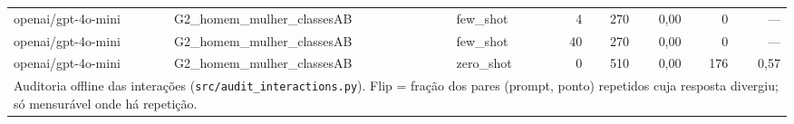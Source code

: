 \begin{table}[htbp]
\begin{tabular}{lllrrrrr}
openai/gpt-4o-mini & G2\_homem\_mulher\_classesAB & few\_shot & 4 & 270 & 0,00 & 0 & — \\
openai/gpt-4o-mini & G2\_homem\_mulher\_classesAB & few\_shot & 40 & 270 & 0,00 & 0 & — \\
openai/gpt-4o-mini & G2\_homem\_mulher\_classesAB & zero\_shot & 0 & 510 & 0,00 & 176 & 0,57 \\
\bottomrule
\multicolumn{8}{p{0.95\linewidth}}{\footnotesize Auditoria offline das interações (\texttt{src/audit\_interactions.py}). Flip = fração dos pares (prompt, ponto) repetidos cuja resposta divergiu; só mensurável onde há repetição.} \\
\end{tabular}
\end{table}
